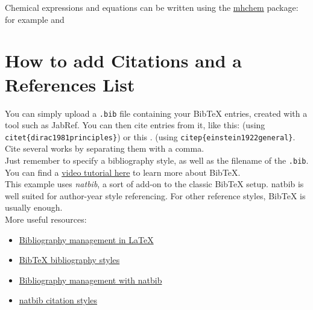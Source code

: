 \documentclass{article}
\begin{document}
Chemical expressions and equations can be written using the \href{https://mirror.init7.net/ctan/macros/latex/contrib/mhchem/mhchem.pdf}{mhchem} package:\\ for example  and 

\newpage

\section{How to add Citations and a References List}

You can simply upload a \verb|.bib| file containing your BibTeX entries, created with a tool such as JabRef. You can then cite entries from it, like this: \citet{dirac1981principles} (using \verb|citet{dirac1981principles}|) or this \citep{einstein1922general}. (using \verb|citep{einstein1922general}|. Cite several works by separating them with a comma.\\
\noindent Just remember to specify a bibliography style, as well as the filename of the \verb|.bib|. You can find a \href{https://www.overleaf.com/help/97-how-to-include-a-bibliography-using-bibtex}{video tutorial here} to learn more about BibTeX.\\
This example uses \textit{natbib}, a sort of add-on to the classic BibTeX setup. natbib is well suited for author-year style referencing. For other reference styles, BibTeX is usually enough.\\

More useful resources:
\begin{itemize}
    \item \href{https://de.overleaf.com/learn/latex/Bibliography_management_in_LaTeX}{Bibliography management in LaTeX}
    \item \href{https://www.overleaf.com/learn/latex/Bibtex_bibliography_styles}{BibTeX bibliography styles}
    \item \href{https://www.overleaf.com/learn/latex/Bibliography_management_with_natbib}{Bibliography management with natbib}
    \item \href{https://de.overleaf.com/learn/latex/Natbib_citation_styles}{natbib citation styles}
\end{itemize}   

\newpage

\end{document}
